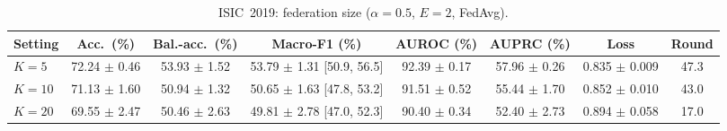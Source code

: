 \begin{table}[!t]
\caption{ISIC~2019: federation size ($\alpha{=}0.5$, $E{=}2$, FedAvg).}
\label{tab:19-nclients}
\centering
\footnotesize
\begin{tabular}{lccccccc}
\toprule
Setting & Acc.\ (\%) & Bal.-acc.\ (\%) & Macro-F1 (\%) & AUROC (\%) & AUPRC (\%) & Loss & Round \\
\midrule
$K=5$ & 72.24 $\pm$ 0.46 & 53.93 $\pm$ 1.52 & 53.79 $\pm$ 1.31 [50.9, 56.5] & 92.39 $\pm$ 0.17 & 57.96 $\pm$ 0.26 & 0.835 $\pm$ 0.009 & 47.3 \\
$K=10$ & 71.13 $\pm$ 1.60 & 50.94 $\pm$ 1.32 & 50.65 $\pm$ 1.63 [47.8, 53.2] & 91.51 $\pm$ 0.52 & 55.44 $\pm$ 1.70 & 0.852 $\pm$ 0.010 & 43.0 \\
$K=20$ & 69.55 $\pm$ 2.47 & 50.46 $\pm$ 2.63 & 49.81 $\pm$ 2.78 [47.0, 52.3] & 90.40 $\pm$ 0.34 & 52.40 $\pm$ 2.73 & 0.894 $\pm$ 0.058 & 17.0 \\
\bottomrule
\end{tabular}
\end{table}